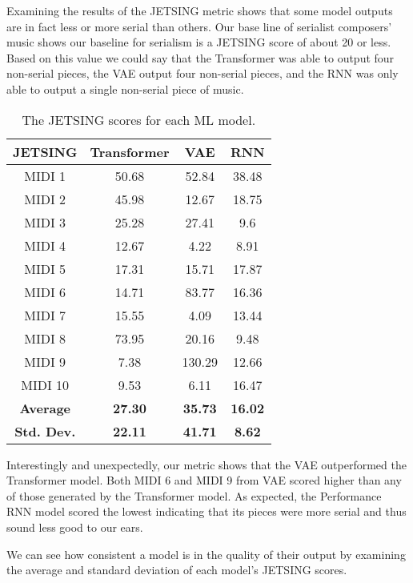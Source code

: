 \documentclass[11pt]{article}
\begin{document}
Examining the results of the JETSING metric shows that some model outputs are in fact less or more serial than others.
Our base line of serialist composers' music shows our baseline for serialism is a JETSING score of about 20 or less.
Based on this value we could say that the Transformer was able to output four non-serial pieces, the VAE output four non-serial pieces,
and the RNN was only able to output a single non-serial piece of music.

\begin{table}
    \centering
    \caption{The JETSING scores for each ML model.}
    \begin{tabular}{c c c c}
        \hline
        JETSING & Transformer & VAE & RNN \\
        \hline
        MIDI 1 & 50.68 & 52.84 & 38.48 \\
        \hline
        MIDI 2 & 45.98 & 12.67 & 18.75 \\
        \hline
        MIDI 3 & 25.28 & 27.41 & 9.6 \\
        \hline
        MIDI 4 & 12.67 & 4.22 & 8.91 \\
        \hline
        MIDI 5 & 17.31 & 15.71 & 17.87 \\
        \hline
        MIDI 6 & 14.71 & 83.77 & 16.36 \\
        \hline
        MIDI 7 & 15.55 & 4.09 & 13.44 \\
        \hline
        MIDI 8 & 73.95 & 20.16 & 9.48 \\
        \hline
        MIDI 9 & 7.38 & 130.29 & 12.66 \\
        \hline
        MIDI 10 & 9.53 & 6.11 & 16.47 \\
        \hline
        \hline
        \textbf{Average} & \textbf{27.30} & \textbf{35.73} & \textbf{16.02} \\
        \hline
        \textbf{Std. Dev.} & \textbf{22.11} & \textbf{41.71} & \textbf{8.62} \\
        \hline
    \end{tabular}
\end{table}

Interestingly and unexpectedly, our metric shows that the VAE outperformed the Transformer model.
Both MIDI 6 and MIDI 9 from VAE scored higher than any of those generated by the Transformer model.
As expected, the Performance RNN model scored the lowest indicating that its pieces were more serial and thus sound less good to our ears.

We can see how consistent a model is in the quality of their output by examining the average and standard deviation of each model's JETSING scores.
\end{document}
